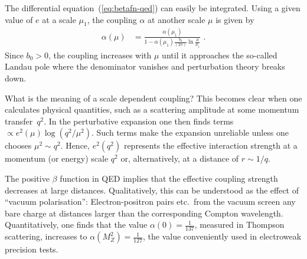 \documentclass[12pt]{report}
\newcommand{\2}{\ensuremath{\sqrt{2}\,}}
\begin{document}
{      The differential equation~(\ref{eq:betafn-qed}) can easily be integrated. Using a given value
      of $e$ at a scale $\mu_1$, the coupling $\alpha$ at another scale $\mu$ is given by
      \begin{align}
        \alpha(\mu) &= \frac{\alpha\left(\mu_1\right)}{1-\alpha\left(\mu_1\right)
          \frac{b_0}{\left(2\pi\right)} \ln \!\frac{\mu}{\mu_1}}\;.
      \end{align}
      Since $b_0>0$, the coupling increases with $\mu$ until it approaches the so-called Landau
      pole where the denominator vanishes and perturbation theory breaks down.

      What is the meaning of a scale dependent coupling? This becomes clear when
      one calculates physical quantities, such as a scattering amplitude at some momentum
      transfer~$q^2$. In the perturbative expansion one then finds terms 
      $\propto e^2(\mu) \log\!\left(q^2/\mu^2\right)$.
      Such terms make the expansion unreliable unless one chooses $\mu^2\sim q^2$.
      Hence, $e^2\!\left(q^2\right)$ represents the effective interaction strength at a
      momentum (or energy) scale $q^2$ or, alternatively, at a distance of $r\sim 1/q$.

      The positive $\beta$ function in QED implies that the effective coupling strength
      decreases at large distances. Qualitatively, this can be understood as the effect
      of ``vacuum polarisation'': Electron-positron pairs etc.\ from the vacuum screen 
      any bare charge at distances larger than the corresponding Compton wavelength.
      Quantitatively, one finds that the value $\alpha(0)=\frac{1}{137}$, measured in
      Thompson scattering, increases to $\alpha\!\left(M_Z^2\right)=\frac{1}{127}$,
      the value conveniently used in electroweak precision tests.


}
\end{document}
